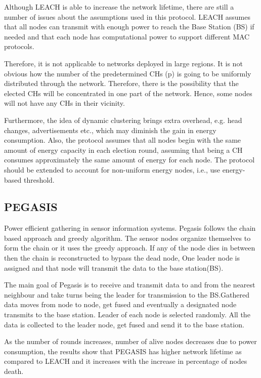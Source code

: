\documentclass[journal,transmag]{IEEEtran}
\begin{document}
Although LEACH is able to increase the network lifetime, there are still a number of issues about the assumptions used in this protocol. LEACH assumes that all nodes can transmit with enough power to reach the Base Station (BS) if needed and that each node has computational power to support different MAC protocols.

Therefore, it is not applicable to networks deployed in large regions. It is not obvious how the number of the predetermined CHs (p) is going to be uniformly distributed through the network. Therefore, there is the possibility that the elected CHs will be concentrated in one part of the network. Hence, some nodes will not have any CHs in their vicinity.

Furthermore, the idea of dynamic clustering brings extra overhead, e.g. head changes, advertisements etc., which may diminish the gain in energy consumption. Also, the protocol assumes that all nodes begin with the same amount of energy capacity in each election round, assuming that being a CH consumes approximately the same amount of energy for each node. The protocol should be extended to account for non-uniform energy nodes, i.e., use energy-based threshold.

\subsection{PEGASIS}

Power efficient gathering in sensor information systems. Pegasis follows the chain based approach and greedy algorithm. The sensor nodes organize themselves to form the chain or it uses the greedy approach. If any of the node dies in between then the chain is reconstructed to bypass the dead node, One leader node is assigned and that node will transmit the data to the base station(BS).

The main goal of Pegasis is to receive and transmit data to and from the nearest neighbour and take turns being the leader for transmission to the BS.Gathered data moves from node to node, get fused and eventually a designated node transmits to the base station. Leader of each node is selected randomly. All the data is collected to the leader node, get fused and send it to the base station.

As the number of rounds increases, number of alive nodes decreases due to power consumption, the results show that PEGASIS has higher network lifetime as compared to LEACH and it increases with the increase in percentage of nodes death.
\end{document}
